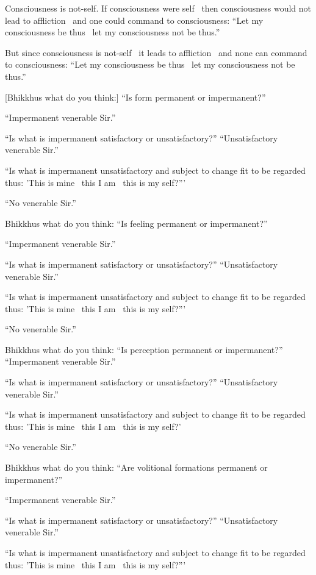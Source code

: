 Consciousness is not-self. If consciousness were self \breathmark\ then consciousness would not lead to affliction \breathmark\ and one could command to consciousness: ``Let my consciousness be thus \breathmark\ let my consciousness not be thus.''

But since consciousness is not-self \breathmark\ it leads to affliction \breathmark\ and none can command to consciousness: ``Let my consciousness be thus \breathmark\ let my consciousness not be thus.''

[Bhikkhus what do you think:] ``Is form permanent or impermanent?''

``Impermanent venerable Sir.''

``Is what is impermanent satisfactory or unsatisfactory?'' ``Unsatisfactory venerable Sir.''

``Is what is impermanent unsatisfactory and subject to change fit to be regarded thus: 'This is mine \breathmark\ this I am \breathmark\ this is my self?'''

``No venerable Sir.''

Bhikkhus what do you think: ``Is feeling permanent or impermanent?''

``Impermanent venerable Sir.''

``Is what is impermanent satisfactory or unsatisfactory?'' ``Unsatisfactory venerable Sir.''

``Is what is impermanent unsatisfactory and subject to change fit to be regarded thus: 'This is mine \breathmark\ this I am \breathmark\ this is my self?'''

``No venerable Sir.''

Bhikkhus what do you think: ``Is perception permanent or impermanent?'' ``Impermanent venerable Sir.''

``Is what is impermanent satisfactory or unsatisfactory?'' ``Unsatisfactory venerable Sir.''

``Is what is impermanent unsatisfactory and subject to change fit to be regarded thus: 'This is mine \breathmark\ this I am \breathmark\ this is my self?'

``No venerable Sir.''

Bhikkhus what do you think: ``Are volitional formations permanent or impermanent?''

``Impermanent venerable Sir.''

``Is what is impermanent satisfactory or unsatisfactory?'' ``Unsatisfactory venerable Sir.''

``Is what is impermanent unsatisfactory and subject to change fit to be regarded thus: 'This is mine \breathmark\ this I am \breathmark\ this is my self?'''

